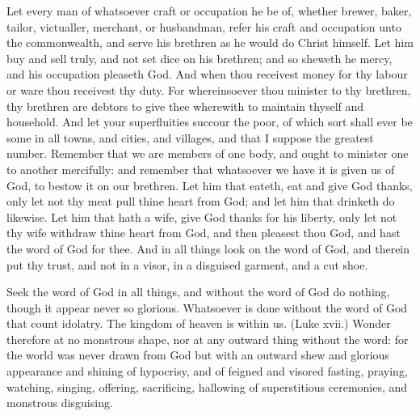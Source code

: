 Let every man of whatsoever craft or occupation he be 
of, whether brewer, baker, tailor, victualler, merchant, or 
husbandman, refer his craft and occupation unto the commonwealth,
and serve his brethren as he would do Christ 
himself. Let him buy and sell truly, and not set dice on 
his brethren; and so sheweth he mercy, and his occupation 
pleaseth God. And when thou receivest money for thy labour
or ware thou receivest thy duty. For whereinsoever 
thou minister to thy brethren, thy brethren are debtors to 
give thee wherewith to maintain thyself and household. 
And let your superfluities succour the poor, of which sort 
shall ever be some in all towns, and cities, and villages, and 
that I suppose the greatest number. Remember that we 
are members of one body, and ought to minister one to 
another mercifully: and remember that whatsoever we have 
it is given us of God, to bestow it on our brethren. Let 
him that eateth, eat and give God thanks, only let not thy 
meat pull thine heart from God; and let him that drinketh 
do likewise. Let him that hath a wife, give God thanks for 
his liberty, only let not thy wife withdraw thine heart from 
God, and then pleasest thou God, and hast the word of God 
for thee. And in all things look on the word of God, and 
therein put thy trust, and not in a visor, in a disguised garment,
and a cut shoe. 

Seek the word of God in all things, and without the 
word of God do nothing, though it appear never so glorious. 
Whatsoever is done without the word of God that count 
idolatry. The kingdom of heaven is within us. (Luke xvii.) 
Wonder therefore at no monstrous shape, nor at any outward
thing without the word: for the world was never drawn 
from God but with an outward shew and glorious appearance 
and shining of hypocrisy, and of feigned and visored fasting, 
praying, watching, singing, offering, sacrificing, hallowing 
of superstitious ceremonies, and monstrous disguising. 

